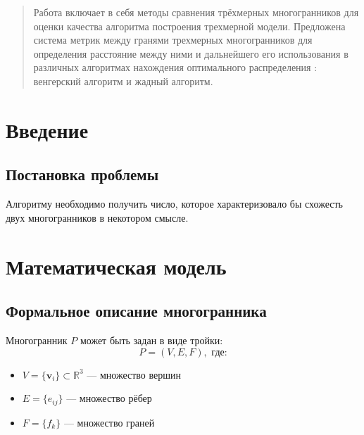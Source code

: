 \documentclass[a4paper,14pt]{extarticle}
\theoremstyle{remark} %
\begin{document}
\maketitle

\begin{abstract}
Работа включает в себя методы сравнения трёхмерных многогранников для оценки качества алгоритма построения трехмерной модели.
Предложена система метрик между гранями трехмерных многогранников для определения расстояние между ними и дальнейшего его использования в различных 
алгоритмах нахождения оптимального распределения : венгерский алгоритм и жадный алгоритм.
\end{abstract}

\section{Введение}

\subsection{Постановка проблемы}
Алгоритму необходимо получить число, которое характеризовало бы схожесть двух многогранников в некотором смысле.

\section{Математическая модель}
\subsection{Формальное описание многогранника}
Многогранник $P$ может быть задан в виде тройки:
\begin{equation}
P = (V, E, F), \text{ где:}
\end{equation}
\begin{itemize}
    \item $V = \{\mathbf{v}_i\} \subset \mathbb{R}^3$ — множество вершин
    \item $E = \{e_{ij}\}$ — множество рёбер
    \item $F = \{f_k\}$ — множество граней
\end{itemize}
\end{document}
